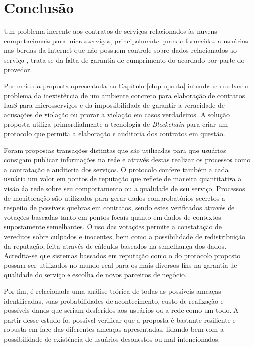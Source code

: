 \chapter{Conclusão}
\label{ch:conclusao}

Um problema inerente aos contratos de serviços relacionados às nuvens computacionais para microsserviços, principalmente quando fornecidos a usuários nas bordas da Internet que não possuem controle sobre dados relacionados ao serviço \cite{nuvem_sla:edge_computing}, trata-se da falta de garantia de cumprimento do acordado por parte do provedor.

%
Por meio da proposta apresentada no Capítulo \ref{ch:proposta} intende-se resolver o problema da inexistência de um ambiente concreto para elaboração de contratos \ac{IaaS} para microsserviços e da impossibilidade de garantir a veracidade de acusações de violação ou provar a violação em casos verdadeiros. A solução proposta utiliza primordialmente a tecnologia de \textit{Blockchain} para criar um protocolo que permita a elaboração e auditoria dos contratos em questão.

Foram propostas transações distintas que são utilizadas para que usuários consigam publicar informações na rede e através destas realizar os processos como a contratação e auditoria dos serviços. O protocolo confere também a cada usuário um valor em pontos de reputação que reflete de maneira quantitativa a visão da rede sobre seu comportamento ou a qualidade de seu serviço. Processos de monitoração são utilizados para gerar dados comprobatórios secretos a respeito de possíveis quebras em contratos, sendo estes verificados através de votações baseadas tanto em pontos focais quanto em dados de contextos supostamente semelhantes. O uso das votações permite a constatação de vereditos sobre culpados e inocentes, bem como a possibilidade de redistribuição da reputação, feita através de cálculos baseados na semelhança dos dados. Acredita-se que sistemas baseados em reputação como o do protocolo proposto possam ser utilizados no mundo real para os mais diversos fins na garantia de qualidade do serviço e escolha de novos parceiros de negócio.

Por fim, é relacionada uma análise teórica de todas as possíveis ameaças identificadas, suas probabilidades de acontecimento, custo de realização e possíveis danos que seriam desferidos aos usuários ou a rede como um todo. A partir desse estudo foi possível verificar que a proposta é bastante resiliente e robusta em face das diferentes ameaças apresentadas, lidando bem com a possibilidade de existência de usuários desonestos ou mal intencionados.